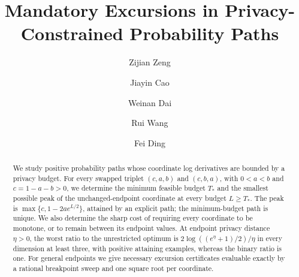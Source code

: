 \documentclass[manuscript,11pt,screen,nonacm,natbib=false]{acmart}
\title{Mandatory Excursions in Privacy-Constrained Probability Paths}
\author{Zijian Zeng}
\affiliation{\institution{UCSI University}\city{}\country{Malaysia}}
\author{Jiayin Cao}
\affiliation{\institution{Ningbo University}\city{}\country{China}}
\author{Weinan Dai}
\affiliation{\institution{Zhejiang University}\city{}\country{China}}
\author{Rui Wang}
\affiliation{\institution{Nanchang Institute of Technology}\city{}\country{China}}
\author{Fei Ding}
\affiliation{\institution{Alibaba Group}\city{}\country{China}}
\date{}
\begin{document}
\singlespacing
\begin{abstract}
\normalsize
We study positive probability paths whose coordinate log derivatives are bounded by a privacy budget. For every swapped triplet $(c,a,b)$ and $(c,b,a)$, with $0<a<b$ and $c=1-a-b>0$, we determine the minimum feasible budget $T_*$ and the smallest possible peak of the unchanged-endpoint coordinate at every budget $L\ge T_*$. The peak is $\max\{c,1-2a e^{L/2}\}$, attained by an explicit path; the minimum-budget path is unique. We also determine the sharp cost of requiring every coordinate to be monotone, or to remain between its endpoint values. At endpoint privacy distance $\eta>0$, the worst ratio to the unrestricted optimum is $2\log((e^\eta+1)/2)/\eta$ in every dimension at least three, with positive attaining examples, whereas the binary ratio is one. For general endpoints we give necessary excursion certificates evaluable exactly by a rational breakpoint sweep and one square root per coordinate.
\end{abstract}
\hypersetup{pageanchor=false}
\maketitle
{}
\enlargethispage{-12pt}
\thispagestyle{empty}
\clearpage
\setcounter{page}{1}
\hypersetup{pageanchor=true}
\pagestyle{submission}

\clearpage


\clearpage
\onehalfspacing
\end{document}
